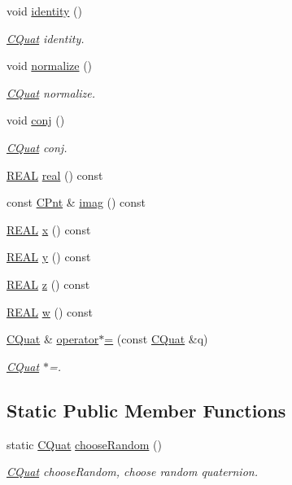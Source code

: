 \begin{DoxyCompactItemize}
\item 
void \hyperlink{classCQuat_a9a0a307a7660ba46e1587b67f5cc35ea}{identity} ()
\begin{DoxyCompactList}\small\item\em \hyperlink{classCQuat}{C\-Quat} identity. \end{DoxyCompactList}\item 
void \hyperlink{classCQuat_ab6e67daab741dfb157e3e5562a804706}{normalize} ()
\begin{DoxyCompactList}\small\item\em \hyperlink{classCQuat}{C\-Quat} normalize. \end{DoxyCompactList}\item 
void \hyperlink{classCQuat_a03c7815f439647be9e4cc8f3937cd0d0}{conj} ()
\begin{DoxyCompactList}\small\item\em \hyperlink{classCQuat}{C\-Quat} conj. \end{DoxyCompactList}\item 
\hyperlink{util_8h_a5821460e95a0800cf9f24c38915cbbde}{R\-E\-A\-L} \hyperlink{classCQuat_a7f18efa604d788a39bb6726de6546ce2}{real} () const 
\item 
const \hyperlink{classCPnt}{C\-Pnt} \& \hyperlink{classCQuat_a783b34fbc307fbb00fd112c8441b0f30}{imag} () const 
\item 
\hyperlink{util_8h_a5821460e95a0800cf9f24c38915cbbde}{R\-E\-A\-L} \hyperlink{classCQuat_ae6b5a06a27a9253ec3737101ddd02ee5}{x} () const 
\item 
\hyperlink{util_8h_a5821460e95a0800cf9f24c38915cbbde}{R\-E\-A\-L} \hyperlink{classCQuat_a01fcb600b793533c9f7554668739ac86}{y} () const 
\item 
\hyperlink{util_8h_a5821460e95a0800cf9f24c38915cbbde}{R\-E\-A\-L} \hyperlink{classCQuat_a1d2b9113413336187282a0dffcf5b39b}{z} () const 
\item 
\hyperlink{util_8h_a5821460e95a0800cf9f24c38915cbbde}{R\-E\-A\-L} \hyperlink{classCQuat_a8e83cf929e0e4f669482b419b20a096c}{w} () const 
\item 
\hyperlink{classCQuat}{C\-Quat} \& \hyperlink{classCQuat_a91a9f75dd706a025a68121522d30a561}{operator$\ast$=} (const \hyperlink{classCQuat}{C\-Quat} \&q)
\begin{DoxyCompactList}\small\item\em \hyperlink{classCQuat}{C\-Quat} $\ast$=. \end{DoxyCompactList}\end{DoxyCompactItemize}
\subsection*{Static Public Member Functions}
\begin{DoxyCompactItemize}
\item 
static \hyperlink{classCQuat}{C\-Quat} \hyperlink{classCQuat_a3788f9ce393c8c6e7dc2df6e7675c594}{choose\-Random} ()
\begin{DoxyCompactList}\small\item\em \hyperlink{classCQuat}{C\-Quat} choose\-Random, choose random quaternion. \end{DoxyCompactList}\end{DoxyCompactItemize}
